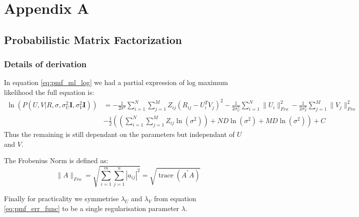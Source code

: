 \chapter{Appendix A}
\section{Probabilistic Matrix Factorization}
\subsection{Details of derivation}
In equation \ref{eq:pmf_ml_log} we had a partial expression of log maximum likelihood the full equation is:
\begin{align*}
\ln (P(U,V|R,\sigma,\sigma_U^2\mathbf{I},\sigma_V^2\mathbf{I})) &= - \frac{1}{2 \sigma^2} \sum_{i=1}^{N} \sum_{j=1}^{M} Z_{ij}(R_{ij}-U_i^TV_j)^2 - \frac{1}{2\sigma_U^2} \sum_{i=1}^{N} \|U_i\|_{Fro}^2 
  - \frac{1}{2\sigma_V^2} \sum_{j=1}^{M} \|V_j\|_{Fro}^2 
\\& -\frac{1}{2}\left( \left( \sum_{i=1}^{N} \sum_{j=1}^{M} Z_{ij} \ln(\sigma^2)\right)+ ND\ln(\sigma^2) + MD \ln(\sigma^2)\right) + C 
\end{align*}
Thus the remaining is still dependant on the parameters but independant of $U$ and $V$.

The Frobenius Norm is defined as:
\begin{equation}
\|A\|_{Fro}=\sqrt{\sum_{i=1}^m\sum_{j=1}^n |a_{ij}|^2}=\sqrt{\operatorname{trace}(A^{{}^*}A)}
\end{equation}

Finally for practicality we symmetrise $\lambda_U$ and $\lambda_V$ from equation \ref{eq:pmf_err_func} to be a single regularisation parameter $\lambda$.

